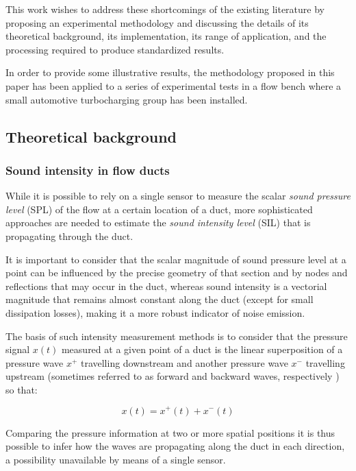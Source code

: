 This work wishes to address these shortcomings of the existing literature by proposing an experimental methodology and discussing the details of its theoretical background, its implementation, its range of application, and the  processing required to produce standardized results.

In order to provide some illustrative results, the methodology proposed in this paper has been applied to a series of experimental tests in a flow bench where a small automotive turbocharging group has been installed.

\subsection{Theoretical background}
\label{sec:theory}

\subsubsection{Sound intensity in flow ducts}
\label{sub:sound_intensity_in_flow_ducts}

While it is possible \cite{figurella2012noise} to rely on a single sensor to measure the scalar \emph{sound pressure level} (SPL) of the flow at a certain location of a duct, more sophisticated approaches are needed to estimate the \emph{sound intensity level} (SIL) that is propagating through the duct.

It is important to consider that the scalar magnitude of sound pressure level at a point can be influenced by the precise geometry of that section and by nodes and reflections that may occur in the duct, whereas sound intensity is a vectorial magnitude that remains almost constant along the duct (except for small dissipation losses), making it a more robust indicator of noise emission.

The basis of such intensity measurement methods is to consider that the pressure signal $x(t)$ measured at a given point of a duct is the linear superposition of a pressure wave $x^+$ travelling downstream and another pressure wave $x^-$ travelling upstream (sometimes referred to as forward and backward waves, respectively \cite{pinero2000estimation}) so that:

\begin{equation}
  x(t)=x^+(t)+x^-(t)
\end{equation}

Comparing the pressure information at two or more spatial positions it is thus possible to infer how the waves are propagating along the duct in each direction, a possibility unavailable by means of a single sensor.

